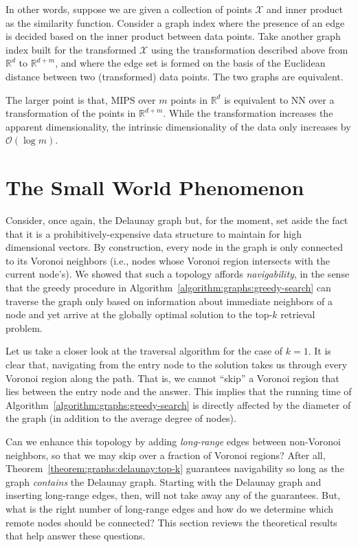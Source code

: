 \begin{svgraybox}
    In other words, suppose we are given a collection of points $\mathcal{X}$
    and inner product as the similarity function. Consider a graph index where
    the presence of an edge is decided based on the inner product between data points.
    Take another graph index built for the transformed $\mathcal{X}$
    using the transformation described above from $\mathbb{R}^d$ to $\mathbb{R}^{d + m}$,
    and where the edge set is formed on the basis of the Euclidean distance between two
    (transformed) data points. The two graphs are equivalent.

    The larger point is that, MIPS over $m$ points in $\mathbb{R}^d$ is equivalent
    to NN over a transformation of the points in $\mathbb{R}^{d + m}$.
    While the transformation increases the apparent dimensionality,
    the intrinsic dimensionality of the data only increases by $\mathcal{O}(\log m)$.
\end{svgraybox}

\section{The Small World Phenomenon}
Consider, once again, the Delaunay graph but, for the moment, set aside
the fact that it is a prohibitively-expensive data structure to maintain for
high dimensional vectors. By construction, every node in the graph is only
connected to its Voronoi neighbors (i.e., nodes whose Voronoi region intersects
with the current node's). We showed that such a topology affords \emph{navigability},
in the sense that the greedy procedure in Algorithm~\ref{algorithm:graphs:greedy-search}
can traverse the graph only based on information about immediate neighbors of a node
and yet arrive at the globally optimal solution to the top-$k$ retrieval problem.

\begin{svgraybox}
Let us take a closer look at the traversal algorithm for the case of $k=1$.
It is clear that, navigating from the entry node to the solution takes us through
every Voronoi region along the path. That is, we cannot ``skip'' a Voronoi region
that lies between the entry node and the answer. This implies that the running time
of Algorithm~\ref{algorithm:graphs:greedy-search} is directly affected by the diameter
of the graph (in addition to the average degree of nodes).
\end{svgraybox}

Can we enhance this topology by adding \emph{long-range} edges between non-Voronoi
neighbors, so that we may skip over a fraction of Voronoi regions? After all,
Theorem~\ref{theorem:graphs:delaunay:top-k} guarantees navigability so long as the graph
\emph{contains} the Delaunay graph. Starting with the Delaunay graph and inserting
long-range edges, then, will not take away any of the guarantees.
But, what is the right number of long-range edges and how do we determine
which remote nodes should be connected? This section reviews the theoretical results
that help answer these questions.

